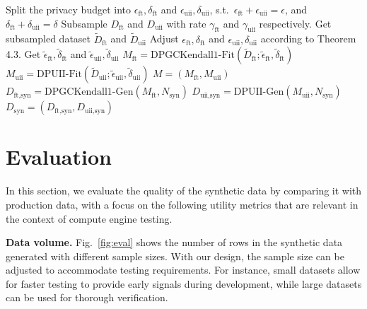 \documentclass[11pt]{article}
\begin{document}
\begin{algorithm}[h]
\caption{Differentially-Private Synthetic Data Generation DPSDG}
\label{alg:complete}
\begin{algorithmic}[1]
\State Split the privacy budget into $\epsilon_{\text{ft}}, \delta_{\text{ft}}$ and
  $\epsilon_{\text{uii}}, \delta_{\text{uii}}$, s.t.\ $\epsilon_{\text{ft}} + \epsilon_{\text{uii}} = \epsilon$,
  and $\delta_{\text{ft}} + \delta_{\text{uii}} = \delta$
\State Subsample $D_{\text{ft}}$ and $D_{\text{uii}}$ with rate $\gamma_{\text{ft}}$ and $\gamma_{\text{uii}}$
  respectively. Get subsampled dataset $\tilde{D}_{\text{ft}}$ and $\tilde{D}_{\text{uii}}$
\State Adjust $\epsilon_{\text{ft}}, \delta_{\text{ft}}$ and $\epsilon_{\text{uii}}, \delta_{\text{uii}}$
  according to Theorem 4.3. Get $\tilde{\epsilon}_{\text{ft}}, \tilde{\delta}_{\text{ft}}$
  and $\tilde{\epsilon}_{\text{uii}}, \tilde{\delta}_{\text{uii}}$
\State $M_{\text{ft}} = \text{DPGCKendall1-Fit}(\tilde{D}_{\text{ft}}; \tilde{\epsilon}_{\text{ft}}, \tilde{\delta}_{\text{ft}})$
\State $M_{\text{uii}} = \text{DPUII-Fit}(\tilde{D}_{\text{uii}}; \tilde{\epsilon}_{\text{uii}}, \tilde{\delta}_{\text{uii}})$
\State \Return $M = (M_{\text{ft}}, M_{\text{uii}})$
\EndProcedure
{}
\State $D_{\text{ft},\text{syn}} = \text{DPGCKendall1-Gen}(M_{\text{ft}}, N_{\text{syn}})$
\State $D_{\text{uii},\text{syn}} = \text{DPUII-Gen}(M_{\text{uii}}, N_{\text{syn}})$
\State \Return $D_{\text{syn}} = (D_{\text{ft},\text{syn}}, D_{\text{uii},\text{syn}})$
\EndProcedure
\end{algorithmic}
\end{algorithm}

\section{Evaluation}
In this section, we evaluate the quality of the synthetic data by comparing
it with production data, with a focus on the following utility metrics
that are relevant in the context of compute engine testing.

\textbf{Data volume.} Fig.~\ref{fig:eval} shows the number of rows in the synthetic
data generated with different sample sizes. With our design, the
sample size can be adjusted to accommodate testing requirements.
For instance, small datasets allow for faster testing to provide
early signals during development, while large datasets can be used
for thorough verification.
\end{document}
